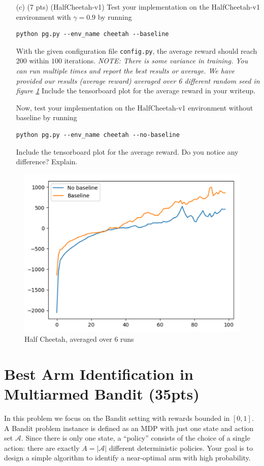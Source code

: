 \documentclass{article}
\begin{document}
\begin{enumerate}
\item[(c) (7 pts)](HalfCheetah-v1)
Test your implementation on the HalfCheetah-v1 environment with $\gamma = 0.9$ by running
\begin{tcolorbox}
\begin{verbatim}
python pg.py --env_name cheetah --baseline
\end{verbatim}
\end{tcolorbox}

With the given configuration file \texttt{config.py}, the average reward should reach $200$ within $100$ iterations. \emph{NOTE: There is some variance in training. You can run multiple times and report the best results or average. We have provided our results (average reward) averaged over 6 different random seed in figure \ref{fig:half}} Include the tensorboard plot for the average reward in your writeup.

Now, test your implementation on the HalfCheetah-v1 environment without baseline by running
\begin{tcolorbox}
\begin{verbatim}
python pg.py --env_name cheetah --no-baseline
\end{verbatim}
\end{tcolorbox}
Include the tensorboard plot for the average reward. Do you notice any difference? Explain.
\end{enumerate}
\begin{figure}[h]
    \centering
    \includegraphics[width=0.25\linewidth]{halfcheetah.png}
    \caption{Half Cheetah, averaged over 6 runs}
    \label{fig:half}
\end{figure}
 
 \newpage

\section{Best Arm Identification in Multiarmed Bandit (35pts)}
In this problem we focus on the Bandit setting with rewards bounded in $[0,1]$. A Bandit problem instance is defined as an MDP with just one state and action set $\mathcal A$. Since there is only one state, a ``policy'' consists of the choice of a single action: there are exactly $A = |\mathcal A|$ different deterministic policies. Your goal is to design a simple algorithm to identify a near-optimal arm with high probability.
\end{document}

